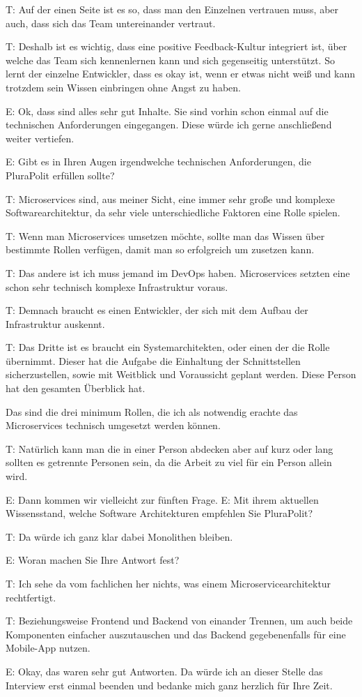  \label{appendix:t-29}
T: Auf der einen Seite ist es so, dass man den  Einzelnen vertrauen muss, aber auch, dass sich das Team untereinander vertraut.

 \label{appendix:t-30}
T: Deshalb ist es wichtig, dass eine positive Feedback-Kultur integriert ist, über welche das Team sich kennenlernen kann und sich gegenseitig unterstützt. So lernt der einzelne Entwickler, dass es okay ist, wenn er etwas nicht weiß und kann trotzdem sein Wissen einbringen ohne Angst zu haben.

E: Ok, dass sind alles sehr gut Inhalte. Sie sind vorhin schon einmal auf die technischen Anforderungen eingegangen. Diese würde ich gerne anschließend weiter vertiefen.

E: Gibt es in Ihren Augen irgendwelche technischen Anforderungen, die PluraPolit erfüllen sollte? 

T: Microservices sind, aus meiner Sicht, eine immer sehr große und komplexe Softwarearchitektur, da sehr viele unterschiedliche Faktoren eine Rolle spielen.

 \label{appendix:t-31}
T: Wenn man Microservices umsetzen möchte, sollte man das Wissen über bestimmte Rollen verfügen, damit man so erfolgreich um zusetzen kann.

 \label{appendix:t-32}
T: Das andere ist ich muss jemand im DevOps haben. Microservices setzten eine schon sehr technisch komplexe Infrastruktur voraus.

 \label{appendix:t-33}
T: Demnach braucht es einen Entwickler, der sich mit dem Aufbau der Infrastruktur auskennt.

 \label{appendix:t-34}
T:  Das Dritte ist es braucht ein Systemarchitekten, oder einen der die Rolle übernimmt. Dieser hat die Aufgabe die Einhaltung der Schnittstellen sicherzustellen, sowie mit Weitblick und Voraussicht geplant werden. Diese Person hat den gesamten Überblick hat.

 Das sind die drei minimum Rollen, die ich als notwendig erachte das Microservices technisch umgesetzt werden können. 

 \label{appendix:t-35}
T: Natürlich kann man die in einer Person abdecken aber auf kurz oder lang sollten es getrennte Personen sein, da die Arbeit zu viel für ein Person allein wird. 

E: Dann kommen wir vielleicht zur fünften Frage.
E: Mit ihrem aktuellen Wissensstand, welche Software Architekturen empfehlen Sie PluraPolit? 

 \label{appendix:t-36}
T: Da würde ich ganz klar dabei Monolithen bleiben.

E: Woran machen Sie Ihre Antwort fest?

 \label{appendix:t-37}
T: Ich sehe da vom fachlichen her nichts, was einem Microservicearchitektur rechtfertigt.

 \label{appendix:t-38}
T: Beziehungsweise Frontend und Backend von einander Trennen, um auch beide Komponenten einfacher auszutauschen und das Backend gegebenenfalls für eine Mobile-App nutzen.

E: Okay, das waren sehr gut Antworten. Da würde ich an dieser Stelle das Interview erst einmal beenden und bedanke mich ganz herzlich für Ihre Zeit.

